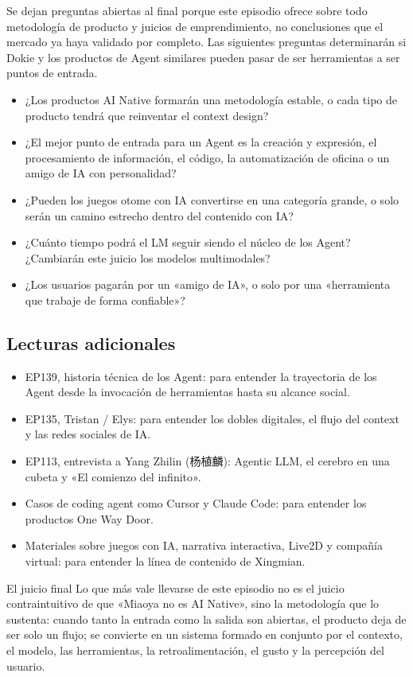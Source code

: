 Se dejan preguntas abiertas al final porque este episodio ofrece sobre todo metodología de producto y juicios de emprendimiento, no conclusiones que el mercado ya haya validado por completo. Las siguientes preguntas determinarán si Dokie y los productos de Agent similares pueden pasar de ser herramientas a ser puntos de entrada.

\begin{itemize}
\item ¿Los productos AI Native formarán una metodología estable, o cada tipo de producto tendrá que reinventar el context design?
\item ¿El mejor punto de entrada para un Agent es la creación y expresión, el procesamiento de información, el código, la automatización de oficina o un amigo de IA con personalidad?
\item ¿Pueden los juegos otome con IA convertirse en una categoría grande, o solo serán un camino estrecho dentro del contenido con IA?
\item ¿Cuánto tiempo podrá el LM seguir siendo el núcleo de los Agent? ¿Cambiarán este juicio los modelos multimodales?
\item ¿Los usuarios pagarán por un «amigo de IA», o solo por una «herramienta que trabaje de forma confiable»?
\end{itemize}

\subsection{Lecturas adicionales}

\begin{itemize}
\item EP139, historia técnica de los Agent: para entender la trayectoria de los Agent desde la invocación de herramientas hasta su alcance social.
\item EP135, Tristan / Elys: para entender los dobles digitales, el flujo del context y las redes sociales de IA.
\item EP113, entrevista a Yang Zhilin (杨植麟): Agentic LLM, el cerebro en una cubeta y «El comienzo del infinito».
\item Casos de coding agent como Cursor y Claude Code: para entender los productos One Way Door.
\item Materiales sobre juegos con IA, narrativa interactiva, Live2D y compañía virtual: para entender la línea de contenido de Xingmian.
\end{itemize}

\begin{importantbox}{El juicio final}
Lo que más vale llevarse de este episodio no es el juicio contraintuitivo de que «Miaoya no es AI Native», sino la metodología que lo sustenta: cuando tanto la entrada como la salida son abiertas, el producto deja de ser solo un flujo; se convierte en un sistema formado en conjunto por el contexto, el modelo, las herramientas, la retroalimentación, el gusto y la percepción del usuario.
\end{importantbox}


